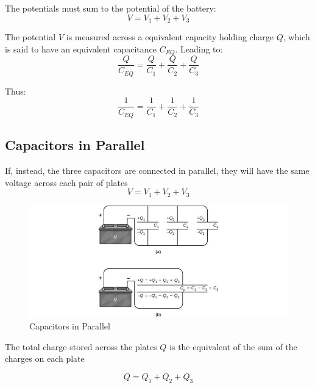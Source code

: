 \documentclass[14pt]{memoir}
\begin{document}
The potentials must sum to the potential of the battery:
\begin{equation}
V = V_1 + V_2 + V_3
\end{equation}

The potential $V$ is measured across a equivalent capacity holding charge $Q$, which is said to have an equivalent capacitance $C_{EQ}$. Leading to:
\begin{equation}
\frac{Q}{C_{EQ}} = \frac{Q}{C_{1}} + \frac{Q}{C_{2}} + \frac{Q}{C_{3}}
\end{equation}

Thus:
\begin{equation}
\frac{1}{C_{EQ}} = \frac{1}{C_{1}} + \frac{1}{C_{2}} + \frac{1}{C_{3}}
\end{equation}



\subsection{Capacitors in Parallel}

If, instead, the three capacitors are connected in parallel, they will have the same voltage across each pair of plates
\begin{equation}
V = V_1 + V_2 + V_3
\end{equation}

\begin{figure}[H]
\begin{center}
\includegraphics[scale=0.60]{fig/fig_08_12.jpg}
\caption{Capacitors in Parallel}
\label{fig:08_12}
\end{center}
\end{figure}

The total charge stored across the plates $Q$ is the equivalent of the sum of the charges on each plate

\begin{equation}
Q = Q_1 + Q_2 + Q_3
\end{equation}
\end{document}
